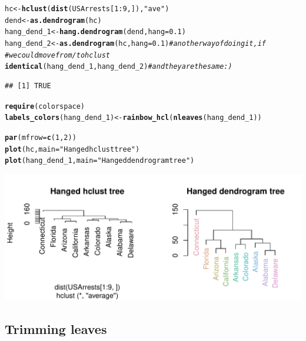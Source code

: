\documentclass[shortnames,nojss,article]{jss}\usepackage[]{graphicx}\usepackage[]{color}
\makeatletter
\def\maxwidth{ %
  \ifdim\Gin@nat@width>\linewidth
    \linewidth
  \else
    \Gin@nat@width
  \fi
}
\newcommand{\hlnum}[1]{\textcolor[rgb]{0.686,0.059,0.569}{#1}}%
\newcommand{\hlstr}[1]{\textcolor[rgb]{0.192,0.494,0.8}{#1}}%
\newcommand{\hlcom}[1]{\textcolor[rgb]{0.678,0.584,0.686}{\textit{#1}}}%
\newcommand{\hlopt}[1]{\textcolor[rgb]{0,0,0}{#1}}%
\newcommand{\hlstd}[1]{\textcolor[rgb]{0.345,0.345,0.345}{#1}}%
\newcommand{\hlkwb}[1]{\textcolor[rgb]{0.69,0.353,0.396}{#1}}%
\newcommand{\hlkwc}[1]{\textcolor[rgb]{0.333,0.667,0.333}{#1}}%
\newcommand{\hlkwd}[1]{\textcolor[rgb]{0.737,0.353,0.396}{\textbf{#1}}}%
\newenvironment{kframe}{%
 \def\at@end@of@kframe{}%
 \ifinner\ifhmode%
  \def\at@end@of@kframe{\end{minipage}}%
  \begin{minipage}{\columnwidth}%
 \fi\fi%
 \def\FrameCommand##1{\hskip\@totalleftmargin \hskip-\fboxsep
 \colorbox{shadecolor}{##1}\hskip-\fboxsep
     \hskip-\linewidth \hskip-\@totalleftmargin \hskip\columnwidth}%
 \MakeFramed {\advance\hsize-\width
   \@totalleftmargin\z@ \linewidth\hsize
   \@setminipage}}%
 {\par\unskip\endMakeFramed%
 \at@end@of@kframe}
\newenvironment{knitrout}{}{} %
\makeatother
\begin{document}
\begin{knitrout}
\color{fgcolor}\begin{kframe}
\begin{alltt}
\hlstd{hc} \hlkwb{<-} \hlkwd{hclust}\hlstd{(}\hlkwd{dist}\hlstd{(USArrests[}\hlnum{1}\hlopt{:}\hlnum{9}\hlstd{, ]),} \hlstr{"ave"}\hlstd{)}
\hlstd{dend} \hlkwb{<-} \hlkwd{as.dendrogram}\hlstd{(hc)}
\hlstd{hang_dend_1} \hlkwb{<-} \hlkwd{hang.dendrogram}\hlstd{(dend,} \hlkwc{hang} \hlstd{=} \hlnum{0.1}\hlstd{)}
\hlstd{hang_dend_2} \hlkwb{<-} \hlkwd{as.dendrogram}\hlstd{(hc,} \hlkwc{hang} \hlstd{=} \hlnum{0.1}\hlstd{)}  \hlcom{# another way of doing it, if }
\hlcom{# we could move from/to hclust}
\hlkwd{identical}\hlstd{(hang_dend_1, hang_dend_2)}  \hlcom{# and they are the same :)}
\end{alltt}
\begin{verbatim}
## [1] TRUE
\end{verbatim}
\begin{alltt}
\hlkwd{require}\hlstd{(colorspace)}
\hlkwd{labels_colors}\hlstd{(hang_dend_1)} \hlkwb{<-} \hlkwd{rainbow_hcl}\hlstd{(}\hlkwd{nleaves}\hlstd{(hang_dend_1)}\hlstd{)}

\hlkwd{par}\hlstd{(}\hlkwc{mfrow} \hlstd{=} \hlkwd{c}\hlstd{(}\hlnum{1}\hlstd{,} \hlnum{2}\hlstd{))}
\hlkwd{plot}\hlstd{(hc,} \hlkwc{main} \hlstd{=} \hlstr{"Hanged hclust tree"}\hlstd{)}
\hlkwd{plot}\hlstd{(hang_dend_1,} \hlkwc{main} \hlstd{=} \hlstr{"Hanged dendrogram tree"}\hlstd{)}
\end{alltt}
\end{kframe}

{\centering \includegraphics[width=\maxwidth]{figure/unnamed-chunk-27} 

}



\end{knitrout}




\subsection{Trimming leaves}
\end{document}
